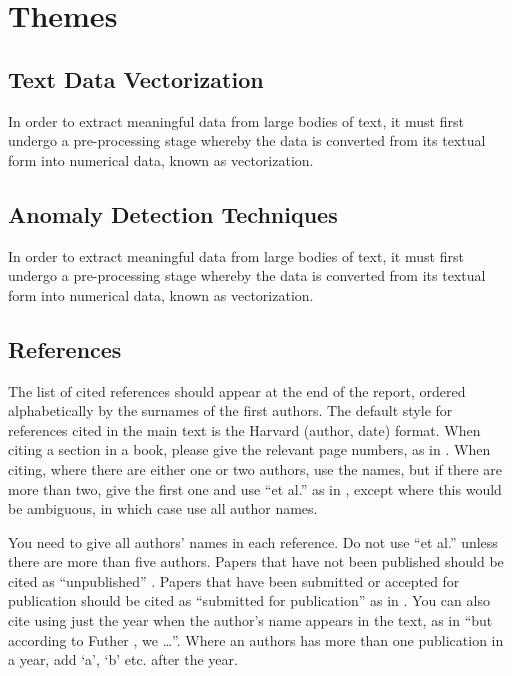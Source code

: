 \documentclass[12pt,a4paper]{article}
\begin{document}
\newpage

\section{Themes}

\subsection{Text Data Vectorization}
In order to extract meaningful data from large bodies of text, it must first undergo a pre-processing stage whereby the data is converted from its textual form into numerical data, known as vectorization. 

\subsection{Anomaly Detection Techniques}
In order to extract meaningful data from large bodies of text, it must first undergo a pre-processing stage whereby the data is converted from its textual form into numerical data, known as vectorization. 

\newpage

\subsection{References}

The list of cited references should appear at the end of the report, ordered alphabetically by the surnames of the first authors.  The default style for references cited in the main text is the  Harvard (author, date) format.  When citing a section in a book, please give the relevant page numbers, as in \cite[p293]{budgen}.  When citing, where there are either one or two authors, use the names, but if there are more than two, give the first one and use ``et al.'' as in  , except where this would be ambiguous, in which case use all author names.

You need to give all authors' names in each reference.  Do not use ``et al.'' unless there are more than five authors.  Papers that have not been published should be cited as ``unpublished'' \cite{euther}.  Papers that have been submitted or accepted for publication should be cited as ``submitted for publication'' as in \cite{futher} .  You can also cite using just the year when the author's name appears in the text, as in ``but according to Futher \citeyear{futher}, we \dots''.  Where an authors has more than one publication in a year, add `a', `b' etc. after the year.





\end{document}
